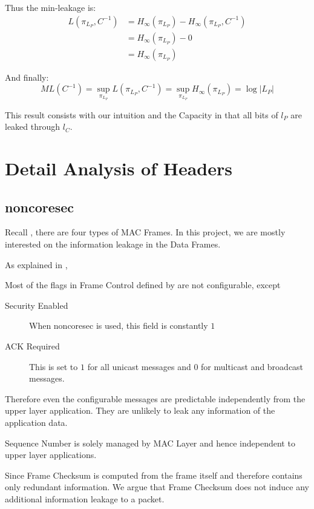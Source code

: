 Thus the min-leakage is:
\begin{equation}
	\begin{aligned}
	L(\pi_{L_P}, C^{-1}) 
	 &= H_{\infty}(\pi_{L_P}) - H_{\infty}(\pi_{L_{P}}, C^{-1}) \\
	 &= H_{\infty}(\pi_{L_P}) - 0 \\
	 &= H_{\infty}(\pi_{L_P})
	\end{aligned}
\end{equation}

And finally:
\begin{equation}
	ML(C^{-1}) = \sup_{\pi_{L_P}}{L(\pi_{L_P},C^{-1})} =  \sup_{\pi_{L_P}} H_{\infty}(\pi_{L_P}) = \log{|L_P|}
\end{equation}

This result consists with our intuition and the Capacity in  that all bits of $l_P$ are leaked through $l_C$.

\chapter{Detail Analysis of Headers}

\section{noncoresec} \label{Detail noncoresec Header}

Recall , there are four types of MAC Frames. In this project, we are mostly interested on the information leakage in the Data Frames.

As explained in ,

\begin{description}[style=nextline]
	\item[Frame Control]
	Most of the flags in Frame Control defined by \cite{802154} are not configurable, except
		\begin{description}
			\item[Security Enabled]
			When noncoresec is used, this field is constantly $1$
			\item[ACK Required]
			This is set to $1$ for all unicast messages and $0$ for multicast and broadcast messages.
		\end{description}
	Therefore even the configurable messages are predictable independently from the upper layer application. They are unlikely to leak any information of the application data.
	
	\item[Sequence Number]
	Sequence Number is solely managed by MAC Layer and hence independent to upper layer applications.
	
	\item[Frame Checksum]
	Since Frame Checksum is computed from the frame itself and therefore contains only redundant information. We argue that Frame Checksum does not induce any additional information leakage to a packet.
\end{description}

